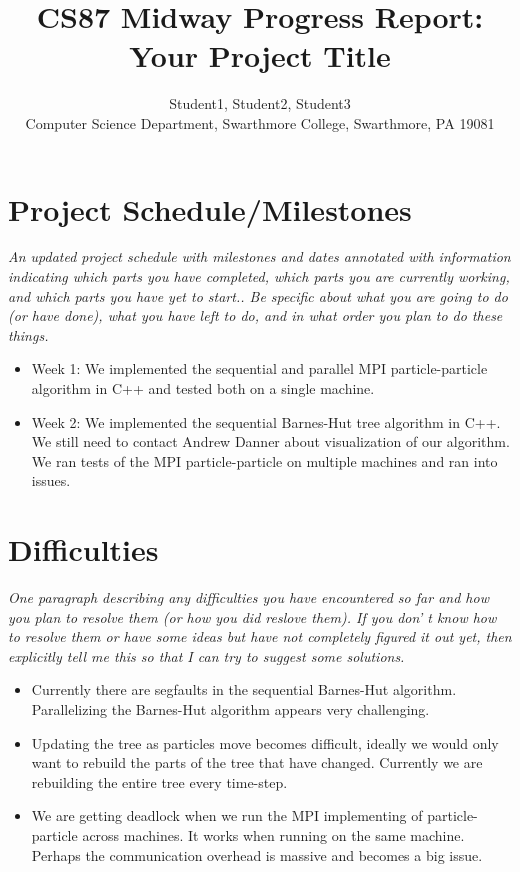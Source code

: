 \documentclass[11pt]{article}
\begin{document}
\title{CS87 Midway Progress Report: Your Project Title}

\author{Student1, Student2, Student3 \\
Computer Science Department, Swarthmore College, Swarthmore, PA  19081}

\maketitle

\section{Project Schedule/Milestones}

{\it
An updated project schedule with milestones and dates annotated with
information indicating which parts you have completed, which parts you are
currently working, and which parts you have yet to start.. Be specific about
what you are going to do (or have done), what you have left to do, and in what
order you plan to do these things.}

\begin{itemize}
\item Week 1: We implemented the sequential and parallel MPI particle-particle algorithm in C++ and tested both on a single machine. 
\item Week 2: We implemented the sequential Barnes-Hut tree algorithm in C++. We still need to contact Andrew Danner about visualization of our algorithm. We ran tests of the MPI particle-particle on multiple machines and ran into issues.
\end{itemize}

\section {Difficulties}
{\it
One paragraph describing any difficulties you have encountered so far and how
you plan to resolve them (or how you did reslove them). If you don' t know how
to resolve them or have some ideas but have not completely figured it out yet,
then explicitly tell me this so that I can try to suggest some solutions.}

\begin{itemize}
    \item Currently there are segfaults in the sequential Barnes-Hut algorithm. Parallelizing the Barnes-Hut algorithm appears very challenging. 
    \item Updating the tree as particles move becomes difficult, ideally we would only want to rebuild the parts of the tree that have changed. Currently we are rebuilding the entire tree every time-step.
    \item We are getting deadlock when we run the MPI implementing of particle-particle across machines. It works when running on the same machine. Perhaps the communication overhead is massive and becomes a big issue. 
\end{itemize}
\end{document}
